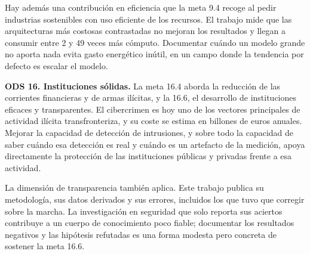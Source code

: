 Hay además una contribución en eficiencia que la meta 9.4 recoge al pedir
industrias sostenibles con uso eficiente de los recursos. El trabajo mide que
las arquitecturas más costosas contrastadas no mejoran los resultados y llegan a
consumir entre 2 y 49 veces más cómputo. Documentar cuándo un modelo grande no
aporta nada evita gasto energético inútil, en un campo donde la tendencia por
defecto es escalar el modelo.

\medskip

\noindent\textbf{ODS 16. Instituciones sólidas.} La meta 16.4 aborda la
reducción de las corrientes financieras y de armas ilícitas, y la 16.6, el
desarrollo de instituciones eficaces y transparentes. El cibercrimen es hoy uno
de los vectores principales de actividad ilícita transfronteriza, y su coste se
estima en billones de euros anuales. Mejorar la capacidad de detección de
intrusiones, y sobre todo la capacidad de saber cuándo esa detección es real y
cuándo es un artefacto de la medición, apoya directamente la protección de las
instituciones públicas y privadas frente a esa actividad.

La dimensión de transparencia también aplica. Este trabajo publica su
metodología, sus datos derivados y sus errores, incluidos los que tuvo que
corregir sobre la marcha. La investigación en seguridad que solo reporta sus
aciertos contribuye a un cuerpo de conocimiento poco fiable; documentar los
resultados negativos y las hipótesis refutadas es una forma modesta pero
concreta de sostener la meta 16.6.
